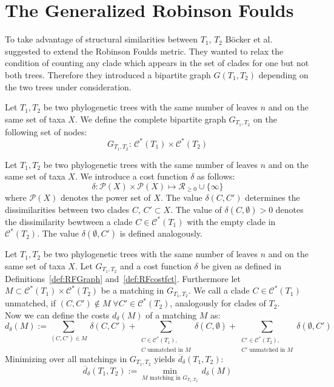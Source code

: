 \section{The Generalized Robinson Foulds}
To take advantage of structural similarities between $T_1$, $T_2$ Böcker et al.~\cite{Boe} suggested to extend the Robinson Foulds metric. They wanted to relax the condition of counting any clade which appears in the set of clades for one but not both trees. Therefore they introduced a bipartite graph $G(T_1, T_2)$ depending on the two trees under consideration. 
\begin{defin}\label{def:RFGraph}
Let $T_1, T_2$ be two phylogenetic trees with the same number of leaves $n$ and on the same set of taxa $X$. We define the complete bipartite graph $G_{T_1,T_2}$ on the following set of nodes:
$$G_{T_1,T_2}: \, \mathcal{C}^*(T_1) \times \mathcal{C}^*(T_2)$$
\end{defin}
\begin{defin}\label{def:RFcostfct}
Let $T_1, T_2$ be two phylogenetic trees with the same number of leaves $n$ and on the same set of taxa $X$. We introduce a cost function $\delta$ as follows:
$$\delta: \mathcal{P}(X) \times \mathcal{P}(X) \mapsto \mathcal{R}_{\geq 0} \cup \{\infty\}$$
where $\mathcal{P}(X)$ denotes the power set of $X$. The value $\delta(C,C')$ determines the dissimilarities between two clades $C$, $C' \subset X$. The value of $\delta(C, \emptyset) > 0$ denotes the dissimilarity bewtween a clade $C \in \mathcal{C}^*(T_1)$ with the empty clade in $\mathcal{C}^*(T_2)$. The value $\delta(\emptyset, C')$ is defined analogously.
\end{defin}
\begin{defin}\label{def:preRFdist}
Let $T_1, T_2$ be two phylogenetic trees with the same number of leaves $n$ and on the same set of taxa $X$. Let $G_{T_1,T_2}$ and a cost function $\delta$ be given as defined in Definitions~\ref{def:RFGraph} and~\ref{def:RFcostfct}. Furthermore let $M \subset \mathcal{C}^*(T_1) \times \mathcal{C}^*(T_2)$ be a matching in $G_{T_1,T_2}$. 
We call a clade $C \in \mathcal{C}^*(T_1)$ unmatched, if $(C, C') \notin M \; \forall C' \in \mathcal{C}^*(T_2)$, analogously for clades of $T_2$.\\
Now we can define the costs $d_{\delta}(M)$ of a matching $M$ as:
$$d_{\delta}(M) := \sum_{(C, C') \in M} \, \delta(C,C') + \sum_{\substack{C \in \mathcal{C}^*(T_1),\\ C\text{ unmatched in }M}} \delta(C, \emptyset) + \sum_{\substack{C' \in \mathcal{C}^*(T_2),\\C'\text{ unmatched in }M}} \delta(\emptyset, C')$$
Minimizing over all matchings in $G_{T_1,T_2}$ yields $\overline{d}_{\delta}(T_1,T_2)$:
$$\overline{d}_{\delta}(T_1,T_2) := \min_{M \text{ matching in }G_{T_1,T_2}} \, d_{\delta}(M)$$
\end{defin}
